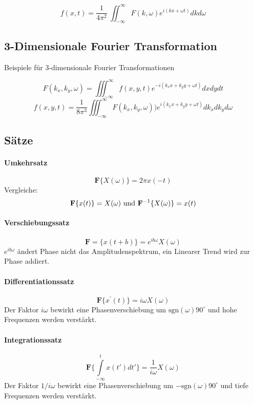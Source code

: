 \[
f(x,t)=\frac{1}{4\pi^2}\ \iint_{-\infty}^\infty F(k,\omega)e^{i(kx+\omega t)} dk d\omega
\]

\subsection{3-Dimensionale Fourier Transformation}
Beispiele für 3-dimensionale Fourier Transformationen

\[
F(k_x,k_y,\omega)=\iiint_{-\infty}^\infty f(x,y,t)e^{-i(k_xx+k_yy+\omega t)} dx dy dt
\]
\[
f(x,y,t)=\frac{1}{8\pi^3} \iiint_{-\infty}^\infty F(k_x,k_y,\omega))e^{i(k_xx+k_yy+\omega t)} dk_x dk_y d\omega
\]


\subsection{Sätze}

\paragraph{Umkehrsatz}
\begin{equation}
\textbf{F} \{X(\omega)\}=2\pi x(-t)
\end{equation}
Vergleiche:
\[
{\bf F} \{x(t)\}=X(\omega) \mbox{ und } {\bf F}^{-1}\{X(\omega)\}=x(t)
\]


\paragraph{Verschiebungssatz}
\begin{equation}
\textbf{F} = \{x(t+b)\}=e^{ib\omega}X(\omega)
\end{equation}
$e^{ib\omega}$ ändert Phase nicht das Amplitudenspektrum, ein Linearer Trend wird zur Phase addiert.


\paragraph{Differentiationssatz}
\begin{equation}
\textbf{F}\{x^\prime(t)\}=i\omega X(\omega)
\end{equation}
Der Faktor $i \omega$ bewirkt eine Phasenverschiebung um $\mbox{sgn}(\omega) 90^\circ$ und hohe Frequenzen werden verstärkt.

\paragraph{Integrationssatz}
\begin{equation}
\textbf{F} \{\int\limits_{-\infty}^{t} x(t')dt'\}=\frac{1}{i\omega} X(\omega)
\end{equation}
Der Faktor $1/i\omega$ bewirkt eine Phasenverschiebung um $-\mbox{sgn}(\omega) 90^\circ$ und tiefe Frequenzen werden verstärkt.

